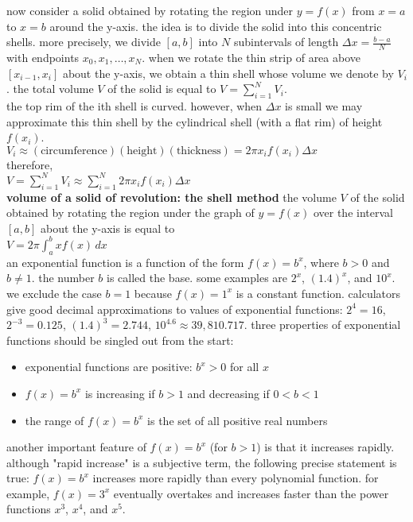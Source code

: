 \documentclass{article}
\begin{document}
now consider a solid obtained by rotating the region under $y = f(x)$ from $x = a$ to $x = b$ around the y-axis. the idea is to divide the solid into this concentric shells. more precisely, we divide $[a, b]$ into $N$ subintervals of length $\Delta x = \frac{b - a}{N}$ with endpoints $x_0, x_1, \ldots, x_N$. when we rotate the thin strip of area above $[x_{i - 1}, x_i]$ about the y-axis, we obtain a thin shell whose volume we denote by $V_i$. the total volume $V$ of the solid is equal to $V = \sum_{i=1}^{N}V_i$.\\

the top rim of the ith shell is curved. however, when $\Delta x$ is small we may approximate this thin shell by the cylindrical shell (with a flat rim) of height $f(x_i)$.\\ $V_i \approx (\text{circumference})(\text{height})(\text{thickness}) = 2\pi x_if(x_i)\Delta x$\\ therefore,\\ $V = \sum_{i=1}^{N}V_i \approx \sum_{i=1}^{N}2\pi x_if(x_i)\Delta x$\\

\textbf{volume of a solid of revolution: the shell method} the volume $V$ of the solid obtained by rotating the region under the graph of $y = f(x)$ over the interval $[a, b]$ about the y-axis is equal to\\ $V = 2\pi \int_{a}^{b}xf(x)\,dx$\\

an exponential function is a function of the form $f(x) = b^x$, where $b > 0$ and $b \neq 1$. the number $b$ is called the base. some examples are $2^x$, $(1.4)^x$, and $10^x$. we exclude the case $b = 1$ because $f(x) = 1^x$ is a constant function. calculators give good decimal approximations to values of exponential functions: $2^4 = 16$, $2^{-3} = 0.125$, $(1.4)^3 = 2.744$, $10^{4.6} \approx 39,810.717$. three properties of exponential functions should be singled out from the start:
	\begin{itemize}
		\item exponential functions are positive: $b^x > 0$ for all $x$
		\item $f(x) = b^x$ is increasing if $b > 1$ and decreasing if $0 < b < 1$
		\item the range of $f(x) = b^x$ is the set of all positive real numbers
	\end{itemize}
another important feature of $f(x) = b^x$ (for $b > 1$) is that it increases rapidly. although "rapid increase" is a subjective term, the following precise statement is true: $f(x) = b^x$ increases more rapidly than every polynomial function. for example, $f(x) = 3^x$ eventually overtakes and increases faster than the power functions $x^3$, $x^4$, and $x^5$.\\
\end{document}
